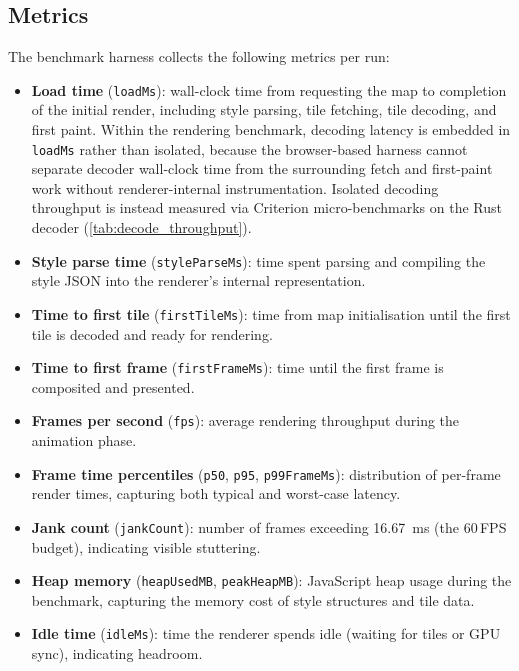 \subsection{Metrics}\label{sub_metrics}

The benchmark harness collects the following metrics per run:

\begin{itemize}
    \item \textbf{Load time} (\texttt{loadMs}): wall-clock time from requesting the map to completion of the initial render, including style parsing, tile fetching, tile decoding, and first paint.
    Within the rendering benchmark, decoding latency is embedded in \texttt{loadMs} rather than isolated, because the browser-based harness cannot separate decoder wall-clock time from the surrounding fetch and first-paint work without renderer-internal instrumentation.
    Isolated decoding throughput is instead measured via Criterion micro-benchmarks on the Rust decoder (\cref{tab:decode_throughput}).
    \item \textbf{Style parse time} (\texttt{styleParseMs}): time spent parsing and compiling the style JSON into the renderer's internal representation.
    \item \textbf{Time to first tile} (\texttt{firstTileMs}): time from map initialisation until the first tile is decoded and ready for rendering.
    \item \textbf{Time to first frame} (\texttt{firstFrameMs}): time until the first frame is composited and presented.
    \item \textbf{Frames per second} (\texttt{fps}): average rendering throughput during the animation phase.
    \item \textbf{Frame time percentiles} (\texttt{p50}, \texttt{p95}, \texttt{p99FrameMs}): distribution of per-frame render times, capturing both typical and worst-case latency.
    \item \textbf{Jank count} (\texttt{jankCount}): number of frames exceeding \qty{16.67}{\milli\second} (the 60\,\ac{FPS} budget), indicating visible stuttering.
    \item \textbf{Heap memory} (\texttt{heapUsedMB}, \texttt{peakHeapMB}): JavaScript heap usage during the benchmark, capturing the memory cost of style structures and tile data.
    \item \textbf{Idle time} (\texttt{idleMs}): time the renderer spends idle (waiting for tiles or GPU sync), indicating headroom.
\end{itemize}

